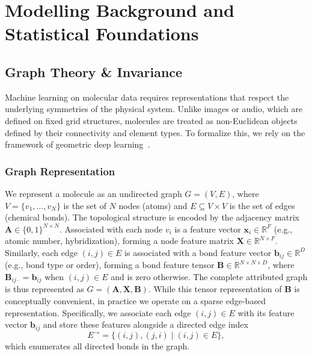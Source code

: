 \chapter{Modelling Background and Statistical Foundations}
\label{chap:math_foundations}

\section{Graph Theory \& Invariance}
\label{sec:graph_theory}

Machine learning on molecular data requires representations that respect the underlying symmetries of the physical system. Unlike images or audio, which are defined on fixed grid structures, molecules are treated as non-Euclidean objects defined by their connectivity and element types. To formalize this, we rely on the framework of geometric deep learning~\cite{bronstein2017geometric}.

\subsection{Graph Representation}
We represent a molecule as an undirected graph $G = (V, E)$, where $V = \{v_1, \dots, v_N\}$ is the set of $N$ nodes (atoms) and $E \subseteq V \times V$ is the set of edges (chemical bonds). The topological structure is encoded by the adjacency matrix $\mathbf{A} \in \{0, 1\}^{N \times N}$. Associated with each node $v_i$ is a feature vector $\mathbf{x}_i \in \mathbb{R}^F$ (e.g., atomic number, hybridization), forming a node feature matrix $\mathbf{X} \in \mathbb{R}^{N \times F}$. Similarly, each edge $(i,j) \in E$ is associated with a bond feature vector $\mathbf{b}_{ij} \in \mathbb{R}^D$ (e.g., bond type or order), forming a bond feature tensor $\mathbf{B} \in \mathbb{R}^{N \times N \times D}$,
where $\mathbf{B}_{ij\cdot} = \mathbf{b}_{ij}$ when $(i,j) \in E$ and is zero otherwise. The complete attributed graph is thus represented as $G = (\mathbf{A}, \mathbf{X}, \mathbf{B})$. While this tensor representation of $\mathbf{B}$ is conceptually convenient, in practice we operate on a sparse edge-based representation. Specifically, we associate each edge $(i,j) \in E$ with its feature vector $\mathbf{b}_{ij}$ and store these features alongside a directed edge index
\begin{equation}
E^{\rightarrow} = \{(i,j), (j,i) \mid (i,j) \in E\},
\end{equation}
which enumerates all directed bonds in the graph.

